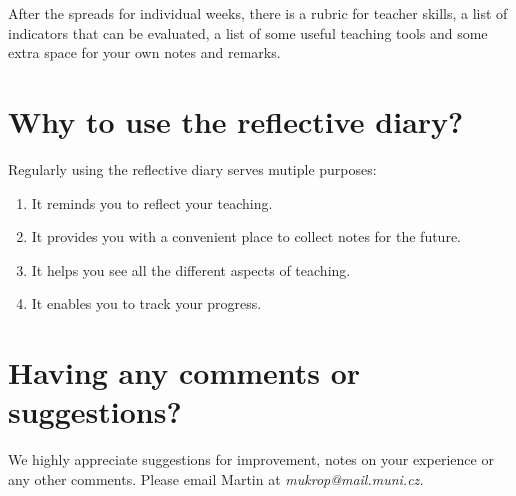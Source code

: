 After the spreads for individual weeks, there is a rubric for teacher skills, a list of indicators that can be evaluated, a list of some useful teaching tools and some extra space for your own notes and remarks.

\section*{Why to use the reflective diary?}

Regularly using the reflective diary serves mutiple purposes:
\begin{enumerate}[topsep=0pt]
\item It reminds you to reflect your teaching.
\item It provides you with a convenient place to collect notes for the future.
\item It helps you see all the different aspects of teaching.
\item It enables you to track your progress.
\end{enumerate}

\section*{Having any comments or suggestions?}

We highly appreciate suggestions for improvement, notes on your experience or any other comments. Please email Martin at \textit{mukrop@mail.muni.cz.}
